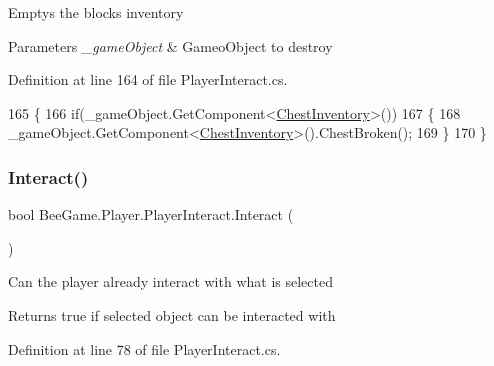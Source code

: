 Emptys the blocks inventory 


\begin{DoxyParams}{Parameters}
{\em \+\_\+game\+Object} & Gameo\+Object to destroy\\
\hline
\end{DoxyParams}


Definition at line 164 of file Player\+Interact.\+cs.


\begin{DoxyCode}
165         \{
166             \textcolor{keywordflow}{if}(\_gameObject.GetComponent<\hyperlink{class_bee_game_1_1_inventory_1_1_chest_inventory}{ChestInventory}>())
167             \{
168                 \_gameObject.GetComponent<\hyperlink{class_bee_game_1_1_inventory_1_1_chest_inventory}{ChestInventory}>().ChestBroken();
169             \}
170         \}
\end{DoxyCode}
\mbox{\label{class_bee_game_1_1_player_1_1_player_interact_a47059ea03d8b16b406ed5218c52198a3}} 
\subsubsection{\texorpdfstring{Interact()}{Interact()}}
{\footnotesize\ttfamily bool Bee\+Game.\+Player.\+Player\+Interact.\+Interact (\begin{DoxyParamCaption}{ }\end{DoxyParamCaption})\hspace{0.3cm}{\ttfamily [private]}}



Can the player already interact with what is selected 

\begin{DoxyReturn}{Returns}
true if selected object can be interacted with
\end{DoxyReturn}


Definition at line 78 of file Player\+Interact.\+cs.


